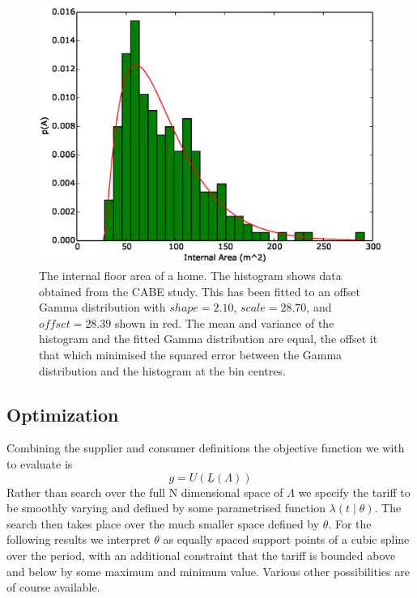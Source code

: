 \documentclass[a4paper, 10 pt, conference]{ieeeconf}  %
\begin{document}
\begin{figure}[htb]
\centering
\includegraphics[width=\columnwidth,trim =0cm 0cm 0cm 0cm,clip=True]{f3.eps}
\caption{The internal floor area of a home. The histogram shows data obtained from the CABE study. This has been fitted to an offset Gamma distribution with $shape=2.10$, $scale=28.70$, and $ offset=28.39$ shown in red. The mean and variance of the histogram and the fitted Gamma distribution are equal, the offset it that which minimised the squared error between the Gamma distribution and the histogram at the bin centres.}
\label{GIA}
\end{figure}

\subsection{Optimization}
\label{opt}
Combining the supplier and consumer definitions the objective function we with to evaluate is
\begin{equation}
g = U(\underline{L}(\Lambda))
\end{equation}
Rather than search over the full N dimensional space of $\Lambda$ we specify the tariff to be smoothly varying and defined by some parametrised function $\lambda(t \mid \theta)$. The search then takes place over the much smaller space defined by $\theta$. For the following results we interpret $\theta$ as equally spaced support points of a cubic spline over the period, with an additional constraint that the tariff is bounded above and below by some maximum and minimum value. Various other possibilities are of course available.
\end{document}
